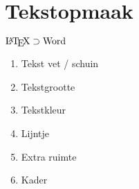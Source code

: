 \documentclass[../presentatie.tex]{subfiles}
\begin{document}
\section{Tekstopmaak}

\begin{frame}{$ \text{\LaTeX}\supset\text{Word} $}
	\begin{enumerate}
		\item Tekst vet / schuin
		\item Tekstgrootte
		\item Tekstkleur
		\item Lijntje
		\item Extra ruimte
		\item Kader
	\end{enumerate}
\end{frame}
\end{document}
